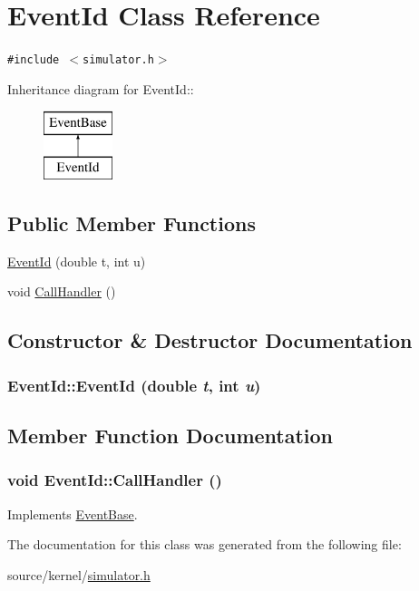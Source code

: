 \hypertarget{classEventId}{
\section{EventId Class Reference}
\label{classEventId}
}
{\tt \#include $<$simulator.h$>$}

Inheritance diagram for EventId::\begin{figure}[H]
\begin{center}
\leavevmode
\includegraphics[height=2cm]{classEventId}
\end{center}
\end{figure}
\subsection*{Public Member Functions}
\begin{CompactItemize}
\item 
\hyperlink{classEventId_e9003f33346c511981dee0dd7e6ad459}{EventId} (double t, int u)
\item 
void \hyperlink{classEventId_8627fa7b92746ddd1bd8b582b68fb3d1}{CallHandler} ()
\end{CompactItemize}


\subsection{Constructor \& Destructor Documentation}
\hypertarget{classEventId_e9003f33346c511981dee0dd7e6ad459}{
\subsubsection[{EventId}]{\setlength{\rightskip}{0pt plus 5cm}EventId::EventId (double {\em t}, \/  int {\em u})}}
\label{classEventId_e9003f33346c511981dee0dd7e6ad459}




\subsection{Member Function Documentation}
\hypertarget{classEventId_8627fa7b92746ddd1bd8b582b68fb3d1}{
\subsubsection[{CallHandler}]{\setlength{\rightskip}{0pt plus 5cm}void EventId::CallHandler ()}}
\label{classEventId_8627fa7b92746ddd1bd8b582b68fb3d1}




Implements \hyperlink{classEventBase_121ca64dec88c8d9589c064b0060d037}{EventBase}.

The documentation for this class was generated from the following file:\begin{CompactItemize}
\item 
source/kernel/\hyperlink{simulator_8h}{simulator.h}\end{CompactItemize}
